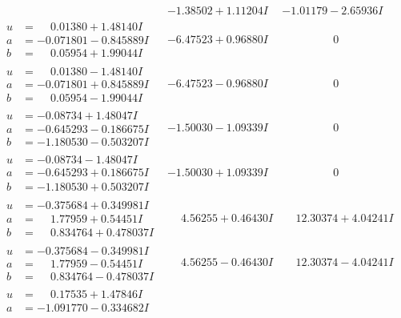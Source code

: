 \documentclass[1p]{elsarticle_modified}
\theoremstyle{definition}
\begin{document}
$$\begin{array}{c|c|c}
 & -1.38502 + 1.11204 I & -1.01179 - 2.65936 I \\ \hline\begin{aligned}
u &= \phantom{-}0.01380 + 1.48140 I \\
a &= -0.071801 - 0.845889 I \\
b &= \phantom{-}0.05954 + 1.99044 I\end{aligned}
 & -6.47523 + 0.96880 I & \phantom{-0.000000 } 0 \\ \hline\begin{aligned}
u &= \phantom{-}0.01380 - 1.48140 I \\
a &= -0.071801 + 0.845889 I \\
b &= \phantom{-}0.05954 - 1.99044 I\end{aligned}
 & -6.47523 - 0.96880 I & \phantom{-0.000000 } 0 \\ \hline\begin{aligned}
u &= -0.08734 + 1.48047 I \\
a &= -0.645293 - 0.186675 I \\
b &= -1.180530 - 0.503207 I\end{aligned}
 & -1.50030 - 1.09339 I & \phantom{-0.000000 } 0 \\ \hline\begin{aligned}
u &= -0.08734 - 1.48047 I \\
a &= -0.645293 + 0.186675 I \\
b &= -1.180530 + 0.503207 I\end{aligned}
 & -1.50030 + 1.09339 I & \phantom{-0.000000 } 0 \\ \hline\begin{aligned}
u &= -0.375684 + 0.349981 I \\
a &= \phantom{-}1.77959 + 0.54451 I \\
b &= \phantom{-}0.834764 + 0.478037 I\end{aligned}
 & \phantom{-}4.56255 + 0.46430 I & \phantom{-}12.30374 + 4.04241 I \\ \hline\begin{aligned}
u &= -0.375684 - 0.349981 I \\
a &= \phantom{-}1.77959 - 0.54451 I \\
b &= \phantom{-}0.834764 - 0.478037 I\end{aligned}
 & \phantom{-}4.56255 - 0.46430 I & \phantom{-}12.30374 - 4.04241 I \\ \hline\begin{aligned}
u &= \phantom{-}0.17535 + 1.47846 I \\
a &= -1.091770 - 0.334682 I \\

\end{aligned}
\end{array}$$
\end{document}
